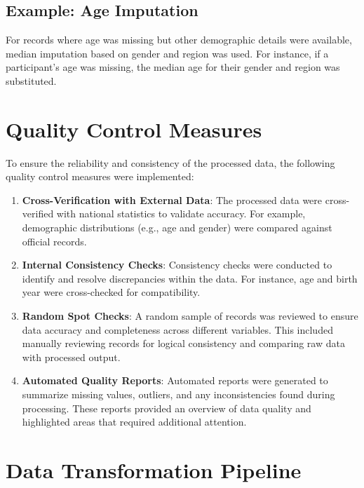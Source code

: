 \documentclass[
]{book}
\providecommand{\tightlist}{%
  \setlength{\itemsep}{0pt}\setlength{\parskip}{0pt}}
\begin{document}
\hypertarget{example-age-imputation}{%
\subsection{Example: Age Imputation}\label{example-age-imputation}}

For records where age was missing but other demographic details were available, median imputation based on gender and region was used. For instance, if a participant's age was missing, the median age for their gender and region was substituted.

\hypertarget{quality-control-measures-1}{%
\section{Quality Control Measures}\label{quality-control-measures-1}}

To ensure the reliability and consistency of the processed data, the following quality control measures were implemented:

\begin{enumerate}
\def\labelenumi{\arabic{enumi}.}
\tightlist
\item
  \textbf{Cross-Verification with External Data}: The processed data were cross-verified with national statistics to validate accuracy. For example, demographic distributions (e.g., age and gender) were compared against official records.
\item
  \textbf{Internal Consistency Checks}: Consistency checks were conducted to identify and resolve discrepancies within the data. For instance, age and birth year were cross-checked for compatibility.
\item
  \textbf{Random Spot Checks}: A random sample of records was reviewed to ensure data accuracy and completeness across different variables. This included manually reviewing records for logical consistency and comparing raw data with processed output.
\item
  \textbf{Automated Quality Reports}: Automated reports were generated to summarize missing values, outliers, and any inconsistencies found during processing. These reports provided an overview of data quality and highlighted areas that required additional attention.
\end{enumerate}

\hypertarget{data-transformation-pipeline}{%
\section{Data Transformation Pipeline}\label{data-transformation-pipeline}}
\end{document}
